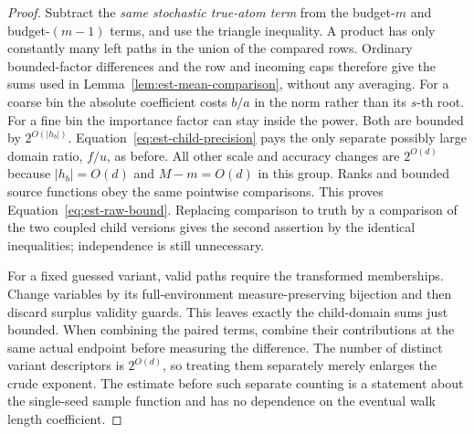 \begin{proof}
Subtract the \emph{same stochastic true-atom term} from the budget-$m$
and budget-$(m-1)$ terms, and use the triangle inequality.  A product has
only constantly many left paths in the union of the compared rows.
Ordinary bounded-factor differences and the row and incoming caps
therefore give the sums used in
Lemma~\ref{lem:est-mean-comparison}, without any averaging.  For a coarse
bin the absolute coefficient costs $b/a$ in the norm rather than its
$s$-th root.  For a fine bin the importance factor can stay inside the
power.  Both are bounded by $2^{O(|h_b|)}$.  Equation~\eqref{eq:est-child-precision}
pays the only separate possibly large domain ratio, $f/u$, as before.
All other scale and accuracy changes are $2^{O(d)}$ because
$|h_b|=O(d)$ and $M-m=O(d)$ in this group.  Ranks and bounded source
functions obey the same pointwise comparisons.  This proves
Equation~\eqref{eq:est-raw-bound}.  Replacing comparison to truth by a
comparison of the two coupled child versions gives the second assertion
by the identical inequalities; independence is still unnecessary.

For a fixed guessed variant, valid paths require the transformed
memberships.  Change variables by its full-environment measure-preserving
bijection and then discard surplus validity guards.  This leaves exactly
the child-domain sums just bounded.  When combining the paired terms,
combine their contributions at the same actual endpoint before measuring
the difference.  The number of distinct variant descriptors is
$2^{O(d)}$, so treating them separately merely enlarges the crude exponent.
The estimate before such separate counting is a statement about the
single-seed sample function and has no dependence on the eventual walk
length coefficient.
\end{proof}

